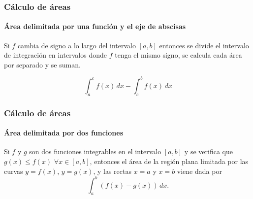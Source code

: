 \begin{frame}
\frametitle{Cálculo de áreas}
\framesubtitle{Área delimitada por una función y el eje de abscisas}
Si $f$ cambia de signo a lo largo del intervalo $[a,b]$ entonces se divide el intervalo de integración en intervalos donde $f$ tenga el mismo signo, se calcula cada área por separado y se suman.
\begin{center}
\scalebox{1}{}
\end{center}
\[\int_a^c f(x)\,dx -\int_c^b f(x)\,dx\]
\end{frame}


\begin{frame}
\frametitle{Cálculo de áreas}
\framesubtitle{Área delimitada por dos funciones}
Si $f$ y $g$ son dos funciones integrables en el intervalo $[a,b]$ y se
verifica que $g(x)\leq f(x)$ $\forall x\in[a,b]$, entonces el área de la región
plana limitada por las curvas $y=f(x)$, $y=g(x)$, y las rectas $x=a$ y $x=b$
viene dada por
\[
\int_{a}^{b}{(f(x)- g(x))\,dx}.
\]

\begin{center}
\scalebox{1}{}
\end{center}
\end{frame}